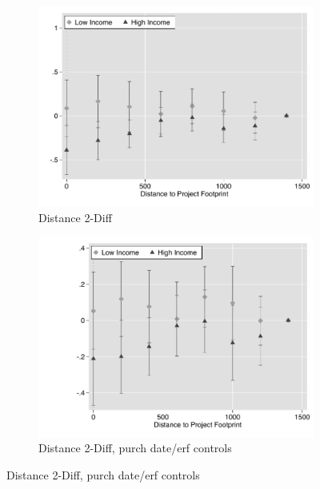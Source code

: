 \documentclass[12pt]{article}
\begin{document}
\begin{figure}
\begin{subfigure}[b]{0.48\textwidth}
        \end{subfigure}
        \begin{subfigure}[b]{0.48\textwidth}
                    \caption[Network2]%
            {{\footnotesize Distance 2-Diff}}    
            \label{fig:prefor}
            \centering
            \includegraphics[width=\textwidth,trim={0.3cm .3cm 0.1cm 0cm}, clip=true]{figures/price_dist_2d_no_ctrl}
        \end{subfigure}
        \hfill
        \begin{subfigure}[b]{0.48\textwidth}
                    \caption[Network2]%
            {{\footnotesize Distance 2-Diff, purch date/erf controls}}    
            \label{fig:prefor}
            \centering
            \includegraphics[width=\textwidth,trim={0.3cm .3cm 0.1cm 0cm}, clip=true]{figures/price_dist_2d_ctrl}
        \end{subfigure}
       
\end{figure}
\end{document}
